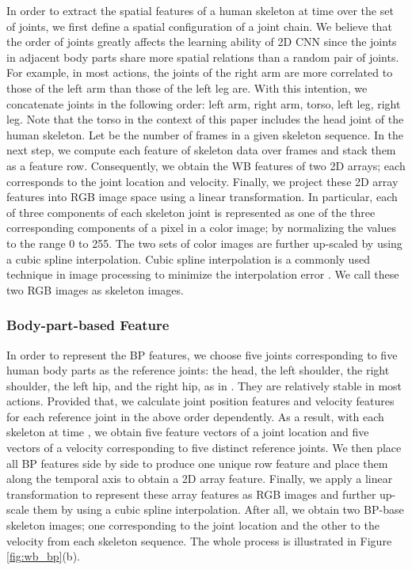 \documentclass{bmvc2k}
\begin{document}
In order to extract the spatial features of a human skeleton at time  over the set of joints, we first define a spatial configuration of a joint chain. We believe that the order of joints greatly affects the learning ability of 2D CNN since the joints in adjacent body parts share more spatial relations than a random pair of joints. For example, in most actions, the joints of the right arm are more correlated to those of the left arm than those of the left leg are. With this intention, we concatenate joints in the following order: left arm, right arm, torso, left leg, right leg. Note that the torso in the context of this paper includes the head joint of the human skeleton. Let  be the number of frames in a given skeleton sequence. In the next step, we compute each feature of skeleton data over  frames and stack them as a feature row. Consequently, we obtain the WB features of two 2D arrays; each corresponds to the joint location and velocity. Finally, we project these 2D array features into RGB image space using a linear transformation. In particular, each of three components  of each skeleton joint is represented as one of the three corresponding components  of a pixel in a color image; by normalizing the  values to the range 0 to 255. The two sets of color images are further up-scaled by using a cubic spline interpolation. Cubic spline interpolation is a commonly used technique in image processing to minimize the interpolation error \cite{hou1978cubic}. We call these two RGB images as skeleton images.
\subsubsection{Body-part-based Feature} 
In order to represent the BP features, we choose five joints corresponding to five human body parts as the reference joints: the head, the left shoulder, the right shoulder, the left hip, and the right hip, as in \cite{ke2017skeletonnet}. They are relatively stable in most actions. Provided that, we calculate joint position features and velocity features for each reference joint in the above order dependently. 
As a result, with each skeleton at time , we obtain five feature vectors of a joint location and five vectors of a velocity corresponding to five distinct reference joints. We then place all BP features side by side to produce one unique row feature and place them along the temporal axis to obtain a 2D array feature. Finally, we apply a linear transformation to represent these array features as RGB images and further up-scale them by using a cubic spline interpolation. After all, we obtain two BP-base skeleton images; one corresponding to the joint location and the other to the velocity from each skeleton sequence. The whole process is illustrated in Figure \ref{fig:wb_bp}(b).
\end{document}
